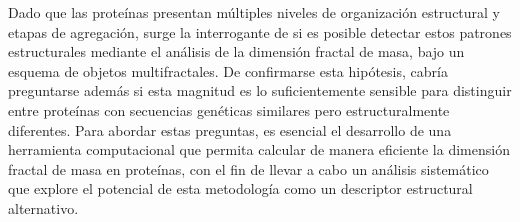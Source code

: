 Dado que las proteínas presentan múltiples niveles de organización estructural y etapas de agregación, surge la interrogante de si es posible detectar estos patrones estructurales mediante el análisis de la dimensión fractal de masa, bajo un esquema de objetos multifractales. De confirmarse esta hipótesis, cabría preguntarse además si esta magnitud es lo suficientemente sensible para distinguir entre proteínas con secuencias genéticas similares pero estructuralmente diferentes. Para abordar estas preguntas, es esencial el desarrollo de una herramienta computacional que permita calcular de manera eficiente la dimensión fractal de masa en proteínas, con el fin de llevar a cabo un análisis sistemático que explore el potencial de esta metodología como un descriptor estructural alternativo.




